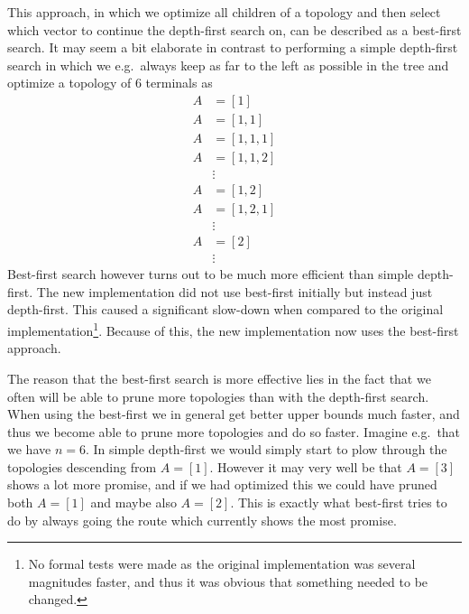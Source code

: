 This approach, in which we optimize all children of a topology and then
select which vector to continue the depth-first search on, can be described as a
best-first search. It may seem a bit elaborate in contrast to performing a
simple depth-first search in which we e.g.\ always keep as far to the left as
possible in the tree and optimize a topology of $6$ terminals as
%
\begin{align}
  A & = [1]     \\
  A & = [1,1]   \\
  A & = [1,1,1] \\
  A & = [1,1,2] \\
    & \vdots    \\
  A & = [1,2]   \\
  A & = [1,2,1] \\
    & \vdots    \\
  A & = [2]     \\
    & \vdots
\end{align}
%
Best-first search however turns out to be much more efficient than simple
depth-first. The new implementation did not use best-first initially but
instead just depth-first. This caused a significant slow-down when compared to
the original implementation\footnote{No formal tests were made as the original
  implementation was several magnitudes faster, and thus it was obvious that
  something needed to be changed.}. Because of this, the new implementation now
uses the best-first approach.

The reason that the best-first search is more effective lies in the fact that
we often will be able to prune more topologies than with the depth-first
search. When using the best-first we in general get better upper bounds much
faster, and thus we become able to prune more topologies and do so
faster. Imagine e.g.\ that we have $n = 6$. In simple depth-first we would
simply start to plow through the topologies descending from $A = [1]$. However
it may very well be that $A = [3]$ shows a lot more promise, and if we had
optimized this we could have pruned both $A = [1]$ and maybe also $A = [2]$.
This is exactly what best-first tries to do by always going the route which
currently shows the most promise.

